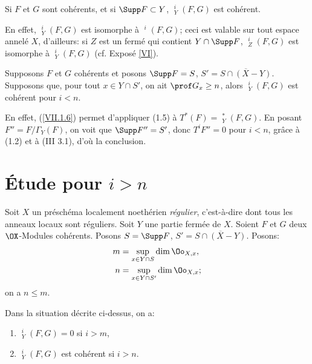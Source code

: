 \begin{lemme}\label{VII.1.6}
Si $F$ et $G$ sont coh\'erents, et si $\Supp F \subset Y$, $\mathop{\underline{\mathrm{Ext}}}\nolimits^i_Y (F, G)$ est coh\'erent.
\end{lemme}

En effet, $\mathop{\underline{\mathrm{Ext}}}\nolimits^i_Y (F, G)$ est isomorphe \`a $\mathop{\underline{\mathrm{Ext}}}\nolimits^i (F, G)$; ceci est valable sur tout espace annel\'e $X$, d'ailleurs: si $Z$ est un ferm\'e qui contient $Y \cap \Supp F$, $\mathop{\underline{\mathrm{Ext}}}\nolimits^i_Z (F, G)$ est isomorphe \`a $\mathop{\underline{\mathrm{Ext}}}\nolimits^i_Y (F, G)$ (cf. Expos\'e \ref{VI}).

\begin{proposition}\label{VII.1.7}
\hspace*{3mm}Supposons $F$ et $G$ coh\'erents et posons $\Supp F = S$, $S' = \overline{S \cap (X-Y)}$. Supposons que, pour tout $x \in Y \cap S'$, on ait $\prof G_x \geq n$, alors $\mathop{\underline{\mathrm{Ext}}}\nolimits^i_Y (F, G)$ est coh\'erent pour $i < n$.
\end{proposition}

En effet, (\ref{VII.1.6}) permet d'appliquer (1.5) \`a $T^{\ast}(F) = \mathop{\underline{\mathrm{Ext}}}\nolimits^{\ast}_Y (F, G)$. En posant $F'' = F/ \Gamma_Y (F)$, on voit que $\Supp F'' = S'$, donc $T^i F'' = 0$ pour $i < n$, gr\^ace \`a (1.2) et \`a (III 3.1), d'o\`u la conclusion.

\section{\'Etude pour $i>n$}\label{VII.2}

Soit $X$ un pr\'esch\'ema localement noeth\'erien \emph{régulier}, c'est-\`a-dire dont tous les anneaux locaux sont r\'eguliers. Soit $Y$ une partie ferm\'ee de $X$. Soient $F$ et $G$ deux $\OX$-Modules coh\'erents. Posons $S = \Supp F$, $S' = \overline{S \cap (X - Y)}$. Posons:
\begin{align*}
m& = \sup_{x \in Y \cap S} \dim \Oo_{X, x},\\
n &= \sup_{x \in Y \cap S'} \dim \Oo_{X, x};
\end{align*}
on a $n \leq m$.

\begin{proposition}\label{VII.2.1}
Dans la situation d\'ecrite ci-dessus, on a:
\begin{enumerate}
\item
$\mathop{\underline{\mathrm{Ext}}}\nolimits^i_Y (F, G) = 0$ si $i > m$,

\item
$\mathop{\underline{\mathrm{Ext}}}\nolimits^i_Y (F, G)$ est coh\'erent si $i > n$.
\end{enumerate}
\end{proposition}

